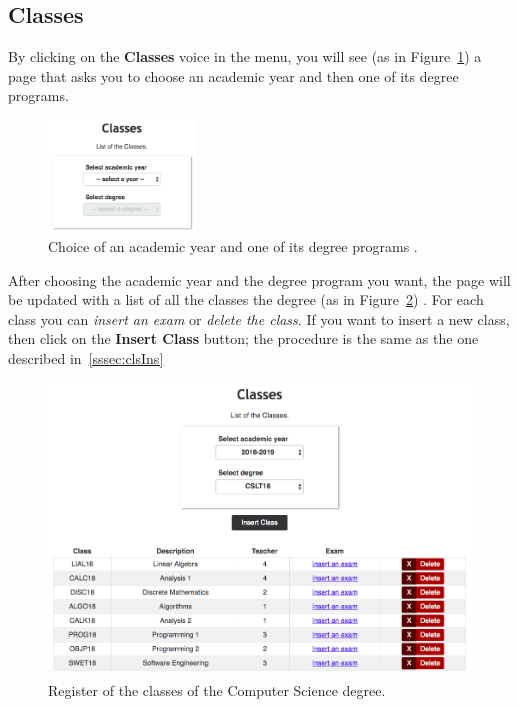 \subsection{Classes}
By clicking on the \textbf{Classes} voice in the menu, you will see (as in Figure~\ref{fig:chooseClass}) a page that asks you to choose an academic year and then one of its degree programs.
\begin{figure}[!h]
	\centering
	\includegraphics[width=0.35\textwidth]{img/chooseClass.png}
	\caption{Choice of an academic year and one of its degree programs .}
	\label{fig:chooseClass}
\end{figure}

After choosing the academic year and the degree program you want, the page will be updated with a list of all the classes the degree (as in Figure~\ref{fig:classes}) . For each class you can \emph{insert an exam}  or \emph{delete the class}. If you want to insert a new class, then click on the \textbf{Insert Class} button; the procedure is the same as the one described in~\ref{sssec:clsIns}
\begin{figure}[!h]
	\centering
	\includegraphics[width=1.0\textwidth]{img/classes.png}
	\caption{Register of the classes of the Computer Science degree.}
	\label{fig:classes}
\end{figure}


